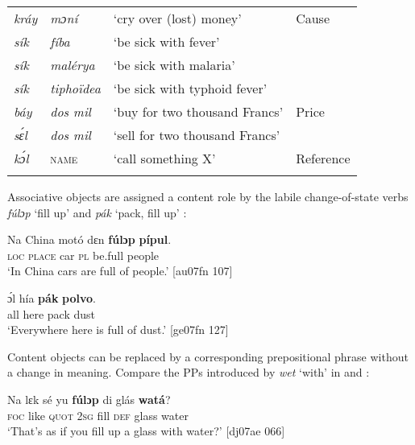\begin{table}
\begin{tabularx}{\textwidth}{llll}
\tablevspace
\itshape kráy & \itshape mɔní & ‘cry over (lost) money’ & Cause\\
\itshape sík & \itshape fíba & ‘be sick with fever’ & \\
\itshape sík & \itshape malérya & ‘be sick with malaria’ & \\
\itshape sík & \itshape tiphoïdea & ‘be sick with typhoid fever’ & \\

\tablevspace
\itshape báy & \itshape dos mil & ‘buy for two thousand Francs’ & Price\\
\itshape sɛ́l & \itshape dos mil & ‘sell for two thousand Francs’ & \\

\tablevspace
\itshape kɔ́l & \textsc{name} & ‘call something X’ & Reference\\
\lspbottomrule
\end{tabularx}
\end{table}
Associative objects are assigned a content role by the labile change-of-state verbs \textit{fúlɔp} ‘fill up’  and \textit{pák} ‘pack, fill up’ : 


\ea%
    \label{ex:key:1173}
    \gll Na  China  motó  dɛn  \textbf{fúlɔp}  \textbf{pípul}.\\
\textsc{loc}  \textsc{place}  car    \textsc{pl}  be.full  people\\

\glt ‘In China cars are full of people.’ [au07fn 107]
\z


\ea%
    \label{ex:key:1174}
    \gll ɔ́l  hía    \textbf{pák}    \textbf{polvo}.\\
all  here    pack  dust\\

\glt ‘Everywhere here is full of dust.’ [ge07fn 127]
\z

Content objects can be replaced by a corresponding prepositional phrase without a change in meaning. Compare the PPs introduced by \textit{wet} ‘with’ in  and :


\ea%
    \label{ex:key:1175}
    \gll Na  lɛk  sé    yu  \textbf{fúlɔp}  di  glás    \textbf{watá}?\\
\textsc{foc}  like  \textsc{quot}    \textsc{2sg}  fill    \textsc{def}  glass  water\\

\glt ‘That’s as if you fill up a glass with water?’ [dj07ae 066]
\z


